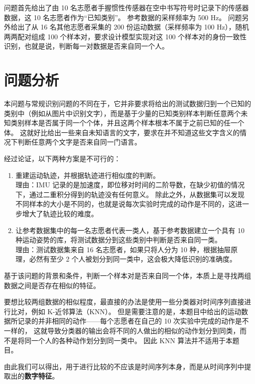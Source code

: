 \documentclass[withoutpreface]{cumcmthesis}
\begin{document}
问题首先给出了由 10 名志愿者手握惯性传感器在空中书写符号时记录下的传感器数据，这 10 名志愿者作为“已知类别”。
参考数据的采样频率为 500 Hz。
问题另外给出了从 16 名其他志愿者采集的 200 份运动数据（采样频率为 100 Hz），随机两两配对组成 100 个样本对，要求设计模型实现对这 100 个样本对的身份一致性识别，也就是说，判断每一对数据是否来自同一个人。

\section{问题分析}

本问题与常规识别问题的不同在于，它并非要求将给出的测试数据归到一个已知的类别中（例如从图片中识别文字），而是基于少量的已知类别样本判断任意两个未知类别样本是否属于同一个个体，并且这两个样本根本不属于之前已知的任一个体。
这就好比给出一些来自未知语言的文字，要求在并不知道这些文字含义的情况下判断任意两个文字是否来自同一门语言。

经过论证，以下两种方案是不可行的：

\begin{enumerate}
    \item 重建运动轨迹，并根据轨迹进行相似度的判断。\\
    理由：IMU 记录的是加速度，即位移对时间的二阶导数，在缺少初值的情况下，通过二重积分得到的轨迹没有任何意义。
    除此之外，从数据集可以发现不同样本的大小是不同的，也就是说每次实验时完成的动作是不同的，这进一步增大了轨迹比较的难度。
    \item 让参考数据集中的每一名志愿者代表一类人，基于参考数据建立一个具有 10 种运动姿势的库，将测试数据分到这些类别中判断是否来自同一类。\\
    理由：测试数据集来自 16 名志愿者，如果只将人分为 10 种，根据抽屉原理，必然有至少 2 个人被划分到同一类中，这会极大降低识别的准确度。
\end{enumerate}

基于该问题的背景和条件，判断一个样本对是否来自同一个体，本质上是寻找两组数据之间是否存在相似的特征。

要想比较两组数据的相似程度，最直接的办法是使用一些分类器对时间序列直接进行比对，例如 K-近邻算法（KNN）。
但是需要注意的是，本题目中给出的运动数据所记录的并非相同的动作——每个志愿者在自己的 10 次实验中完成的动作是不一样的，
这就导致分类器的输出会将不同的人做出的相似的动作划分到同类，而不是将同一个人的各种动作划分到同一类中。
因此 KNN 算法并不适用于本题目。

由此我们可以得出，用于进行比较的不应该是时间序列本身，而是从时间序列中提取出的\textbf{数字特征}。
\end{document}
